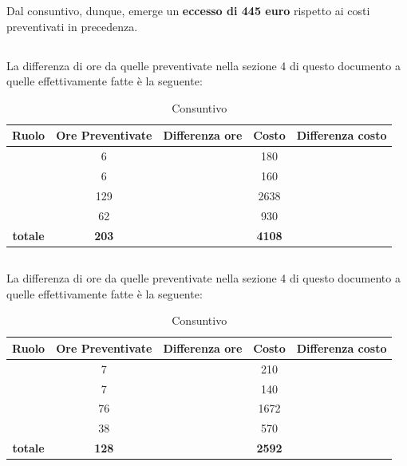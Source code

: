 Dal consuntivo, dunque, emerge un \textbf{eccesso di 445 euro} rispetto ai costi preventivati in precedenza.

\newpage

\subsection{\PA}
La differenza di ore da quelle preventivate nella sezione 4 di questo documento a quelle effettivamente fatte è la seguente:

\begin{table}[h]
	\begin{center}
		\begin{tabular}{|c|c|c|c|c|}
			\hline
			\textbf{Ruolo}	& \textbf{Ore Preventivate} & \textbf{Differenza ore} & \textbf{Costo} & \textbf{Differenza costo}\\
			\hline
			\Pm &	6  & &	180 &	\\
			\hline
			\Am	&	6 &	& 160 & \\
			\hline
			\Prog	&	129 & & 2638 & \\
			\hline
			\Ver &	62 & & 930 & \\
			\hline
			\textbf{totale}	&	\textbf{203} & & \textbf{4108} & \\
			\hline
		\end{tabular}
	\end{center}
	\caption{Consuntivo \PA}
\end{table}

\newpage

\subsection{\PD}
La differenza di ore da quelle preventivate nella sezione 4 di questo documento a quelle effettivamente fatte è la seguente:


\begin{table}[h]
	\begin{center}
		\begin{tabular}{|c|c|c|c|c|}
			\hline
			\textbf{Ruolo}	& \textbf{Ore Preventivate} & \textbf{Differenza ore} & \textbf{Costo} & \textbf{Differenza costo}\\
			\hline
			\Pm &	7  & &	210 &	\\
			\hline
			\Am	&	7 &	& 140 & \\
			\hline
			\Prog	&	76 & & 1672 & \\
			\hline
			\Ver &	38 & & 570 & \\
			\hline
			\textbf{totale}	&	\textbf{128} & & \textbf{2592} & \\
			\hline
		\end{tabular}
	\end{center}
	\caption{Consuntivo \PD}
\end{table}